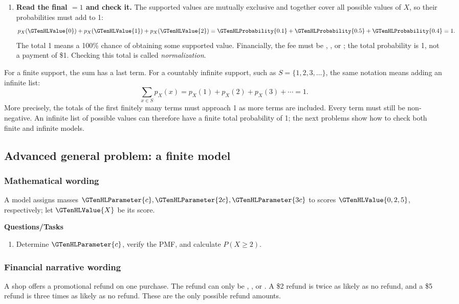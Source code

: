 \begin{enumerate}
\item \textbf{Read the final $=1$ and check it.} The supported values are mutually exclusive and together cover all possible values of $X$, so their probabilities must add to 1:
\[
p_X(\GTenHLValue{0})+p_X(\GTenHLValue{1})+p_X(\GTenHLValue{2})=\GTenHLProbability{0.1}+\GTenHLProbability{0.5}+\GTenHLProbability{0.4}=1.
\]
The total 1 means a 100\% chance of obtaining some supported value. Financially, the fee must be , , or ; the total probability is 1, not a payment of \$1. Checking this total is called \emph{normalization}.
\end{enumerate}

For a finite support, the sum has a last term. For a countably infinite support, such as $S=\{1,2,3,\ldots\}$, the same notation means adding an infinite list:
\[
\sum_{x\in S}p_X(x)=p_X(1)+p_X(2)+p_X(3)+\cdots=1.
\]
More precisely, the totals of the first finitely many terms must approach 1 as more terms are included. Every term must still be non-negative. An infinite list of possible values can therefore have a finite total probability of 1; the next problems show how to check both finite and infinite models.
\subsection{Advanced general problem: a finite model}
\subsubsection*{Mathematical wording}
A model assigns masses $\GTenHLParameter{c},\GTenHLParameter{2c},\GTenHLParameter{3c}$ to scores $\GTenHLValue{0,2,5}$, respectively; let $\GTenHLValue{X}$ be its score.

\textbf{Questions/Tasks}
\begin{enumerate}
\item Determine $\GTenHLParameter{c}$, verify the PMF, and calculate $P(X\geq2)$.
\end{enumerate}
\subsubsection*{Financial narrative wording}
A shop offers a promotional refund on one purchase. The refund can only be , , or . A \$2 refund is twice as likely as no refund, and a \$5 refund is three times as likely as no refund. These are the only possible refund amounts.


